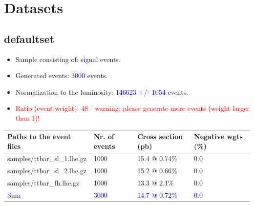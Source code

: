 \documentclass[a4paper, 10pt]{article}
\begin{document}
\section{ Datasets}

\subsection{ defaultset}

\begin{itemize}
  \item Sample consisting of: \textcolor{blue}{signal}  events.
   \item Generated events: \textcolor{blue}{3000 }  events.
   \item Normalization to the luminosity: \textcolor{blue}{146623}\textcolor{blue}{ +/\-- }\textcolor{blue}{1054 }  events.
   \item\textcolor{red}{Ratio (event weight): }\textcolor{red}{48 }\textcolor{red}{ - warning: please generate more events (weight larger than 1)!}
\textcolor{red}{}
\end{itemize}
\begin{table}[H]
  \begin{center}
    \begin{tabular}{|m{55.0mm}|m{25.0mm}|m{30.0mm}|m{30.0mm}|}
      \hline
      {\cellcolor{yellow}         Paths to the event files}& {\cellcolor{yellow}         Nr. of events}& {\cellcolor{yellow}         Cross section (pb)}& {\cellcolor{yellow}         Negative wgts (\%)}\\
      \hline
      {\cellcolor{white}          samples/\-ttbar\_sl\_1.lhe.gz}& {\cellcolor{white}          1000}& {\cellcolor{white}          15.4 @ 0.74\%}& {\cellcolor{white}          0.0}\\
      \hline
      {\cellcolor{white}          samples/\-ttbar\_sl\_2.lhe.gz}& {\cellcolor{white}          1000}& {\cellcolor{white}          15.2 @ 0.66\%}& {\cellcolor{white}          0.0}\\
      \hline
      {\cellcolor{white}          samples/\-ttbar\_fh.lhe.gz}& {\cellcolor{white}          1000}& {\cellcolor{white}          13.3 @ 2.1\%}& {\cellcolor{white}          0.0}\\
      \hline
      {\cellcolor{white}         \textcolor{blue}{Sum}}& {\cellcolor{white}         \textcolor{blue}{3000}}& {\cellcolor{white}         \textcolor{blue}{14.7 @ 0.72\%}}& {\cellcolor{white}         \textcolor{blue}{0.0}}\\
\hline
    \end{tabular}
  \end{center}
\end{table}
\end{document}
